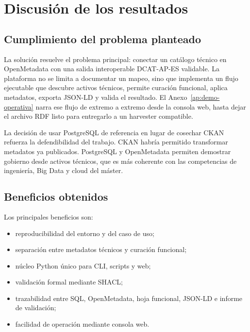 \section{Discusión de los resultados}\label{sec:discusion-resultados}

\subsection{Cumplimiento del problema planteado}

La solución resuelve el problema principal: conectar un catálogo técnico en OpenMetadata con una salida interoperable DCAT-AP-ES validable. La plataforma no se limita a documentar un mapeo, sino que implementa un flujo ejecutable que descubre activos técnicos, permite curación funcional, aplica metadatos, exporta JSON-LD y valida el resultado. El Anexo~\ref{ap:demo-operativa} narra ese flujo de extremo a extremo desde la consola web, hasta dejar el archivo RDF listo para entregarlo a un harvester compatible.

La decisión de usar PostgreSQL de referencia en lugar de cosechar CKAN refuerza la defendibilidad del trabajo. CKAN habría permitido transformar metadatos ya publicados. PostgreSQL y OpenMetadata permiten demostrar gobierno desde activos técnicos, que es más coherente con las competencias de ingeniería, Big Data y cloud del máster.

\subsection{Beneficios obtenidos}

Los principales beneficios son:

\begin{itemize}
  \item reproducibilidad del entorno y del caso de uso;
  \item separación entre metadatos técnicos y curación funcional;
  \item núcleo Python único para CLI, scripts y web;
  \item validación formal mediante SHACL;
  \item trazabilidad entre SQL, OpenMetadata, hoja funcional, JSON-LD e informe de validación;
  \item facilidad de operación mediante consola web.
\end{itemize}

